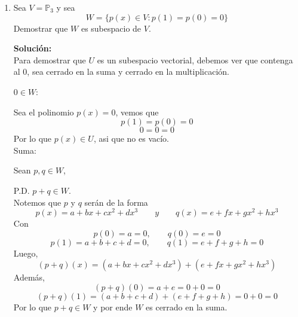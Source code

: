 \documentclass[12pt]{article}
\newenvironment{solucion}
{\begin{mdframed}[backgroundcolor=black!10]
		{\bf Solución:}\\
	}
	{
	\end{mdframed}
}
\newenvironment{preguntas}
{\begin{enumerate}\itemsep12pt
	}
	{
	\end{enumerate}
}
\newcommand{\R}{\mathbb{R}}
\begin{document}
\begin{preguntas}
\begin{solucion}
		Sean $p, q \in U$,
		
		P.D.
		$$ \begin{array}{rcl}
		(p+q)(1) + (p+q)(0) &= &(p+q)(-1)\\
		p(1) + q(1)+ p(0)+q(0) &= &(p+q)(-1)\\
		p(1) + p(0)+ q(1) + q(0) &= &(p+q)(-1)\\
		p(-1)+ q(-1) &= &(p+q)(-1)\\
		(p+q)(-1) &= &(p+q)(-1)
		\end{array}$$
		Por lo que es cerrado en la suma
		
		Multiplicación:
		
		Sea $p \in U$ y $\alpha \in \R$,
		P.D.
		$$ \begin{array}{rcl}
		(\alpha p)(1) + (\alpha p)(0) = (\alpha p)(-1) \\
		\alpha p(1) + \alpha p(0) = (\alpha p)(-1) \\
		\alpha ( p(1) +  p(0)) = (\alpha p)(-1) \\
		\alpha p(-1) = (\alpha p)(-1)\\
		(\alpha  p)(-1) = (\alpha p)(-1)
		\end{array}$$
		 
		Por lo que es cerrado en la multiplicación
		
		Entonces, tenemos que $U$ es un subespacio de $V$.
		$$\blacksquare$$
\end{solucion}
\item Sea $V = \mathbb{P}_3$ y sea
$$W = \{p(x) \in V: p(1) = p(0) =0\}$$
Demostrar que $W$ es subespacio de $V$.
\begin{solucion}
Para demostrar que $U$ es un subespacio vectorial, debemos ver que contenga al 0, sea cerrado en la suma y cerrado en la multiplicación.

$0 \in W$:

Sea el polinomio $p(x) = 0$, vemos que
$$p(1) = p(0) = 0$$
$$0 = 0 = 0$$
Por lo que $p(x) \in U$, asi que no es vacío.\\

Suma:

Sean $p, q \in W$,

P.D. $p + q \in W$.\\

Notemos que $p$ y $q$ serán de la forma
$$p(x) = a + bx + cx^2 + dx^3 \qquad y \qquad q(x) = e + fx + gx^2 + hx^3$$
Con
$$p(0) = a = 0, \qquad q(0) = e = 0$$
$$p(1) = a + b + c + d = 0,\qquad q(1) = e + f + g + h = 0$$
Luego,
$$(p+q)(x) = (a + bx + cx^2 + dx^3) + (e + fx + gx^2 + hx^3)$$
Además,
$$(p+q)(0) = a + e = 0 + 0 = 0$$
$$(p+q)(1) = (a + b + c + d) + (e + f + g + h) = 0 + 0 = 0$$
Por lo que $p + q \in W$ y por ende $W$ es cerrado en la suma.\\


\end{solucion}
\end{preguntas}
\end{document}

